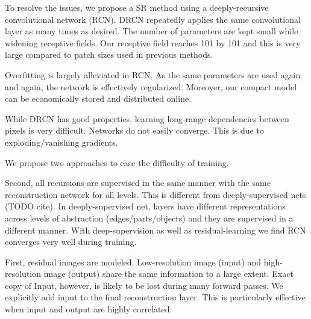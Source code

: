 \documentclass[10pt,twocolumn,letterpaper]{article}
\begin{document}
To resolve the issues, we propose a SR method using a deeply-recursive convolutional network (RCN). DRCN repeatedly applies the same convolutional layer as many times as desired. The number of parameters are kept small while widening receptive fields. Our receptive field reaches 101 by 101 and this is very large compared to patch sizes used in previous methods. 

Overfitting is largely alleviated in RCN. As the same parameters are used again and again, the network is effectively regularized. Moreover, our compact model can be economically stored and distributed online.   

While DRCN has good properties, learning long-range dependencies between pixels is very difficult. Networks do not easily converge. This is due to exploding/vanishing gradients. 

We propose two approaches to ease the difficulty of training.  


%
%

Second, all recursions are supervised in the same manner with the same reconstruction network for all levels. This is different from deeply-supervised nets (TODO cite). In deeply-supervised net, layers have different representations across levels of abstraction (edges/parts/objects) and they are supervised in a different manner. With deep-supervision as well as residual-learning we find RCN converges very well during training. 

First, residual images are modeled. Low-resolution image (input) and high-resolution image (output) share the same information to a large extent. Exact copy of Input, however, is likely to be lost during many forward passes. We explicitly add input to the final reconstruction layer. This is particularly effective when input and output are highly correlated.
\end{document}
